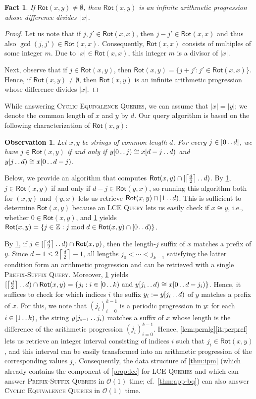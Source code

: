 \documentclass[a4paper]{article}
\newtheorem{fact}[theorem]{Fact}
\newtheorem{observation}[theorem]{Observation}
\theoremstyle{definition}
\theoremstyle{remark}
\newcommand{\BQ}{\textsc{Prefix-Suffix Queries}\xspace}
\newcommand{\FC}{\textsc{Cyclic Equivalence Queries}\xspace}
\newcommand{\LCEQ}{\textsc{LCE Queries}\xspace}
\newcommand{\ceil}[1]{\left\lceil #1 \right\rceil}
\newcommand{\integ}{\mathbb{Z}}
\newcommand{\dd}{\mathinner{\ldotp\ldotp}}
\newcommand{\ROT}{\mathsf{Rot}}
\newcommand{\Oh}{\mathcal{O}}
\begin{document}
\begin{fact}\label{fct:FC}
  If $\ROT(x,y)\ne \emptyset$, then $\ROT(x,y)$ is an infinite arithmetic progression whose difference divides~$|x|$.
\end{fact}
\begin{proof}
  Let us note that if $j,j'\in \ROT(x,x)$, then $j-j'\in \ROT(x,x)$ and thus also $\gcd(j,j')\in \ROT(x,x)$.
  Consequently, $\ROT(x,x)$ consists of multiples of some integer $m$.
  Due to $|x|\in \ROT(x,x)$, this integer $m$ is a divisor of $|x|$.

  Next, observe that if $j\in \ROT(x,y)$, then $\ROT(x,y)=\{j + j' : j'\in \ROT(x,x)\}$.
  Hence, if $\ROT(x,y)\ne \emptyset$, then $\ROT(x,y)$ is an infinite arithmetic progression whose difference divides $|x|$.
\end{proof}

While answering \FC, we can assume that $|x|=|y|$;
we denote the common length of $x$ and $y$ by $d$.
Our query algorithm is based on the following characterization of $\ROT(x,y)$:

\begin{observation}\label{obs:rot}
Let $x,y$ be strings of common length $d$. For every $j\in [0\dd d]$,
we have $j\in \ROT(x,y)$ if and only if $y[0\dd j) \cong x[d-j\dd d)$ and $y[j\dd d)\cong x[0\dd d-j)$.
\end{observation}


Below, we provide an algorithm that computes $\ROT(x,y)\cap [\ceil{\frac{d}{2}}\dd d)$.
By \cref{obs:rot}, $j\in \ROT(x,y)$ if and only if $d-j\in \ROT(y,x)$, so running this algorithm both for $(x,y)$
and $(y,x)$ lets us retrieve $\ROT(x,y)\cap [1\dd d)$.
This is sufficient to determine $\ROT(x,y)$ because an \textsc{LCE Query} lets us easily check if $x \cong y$, i.e., whether $0\in \ROT(x,y)$, and \cref{fct:FC} yields $\ROT(x,y) = \{j \in \integ : j\bmod d \in \ROT(x,y) \cap [0\dd d)\}$.

By \cref{obs:rot}, if $j\in [\ceil{\frac{d}{2}}\dd d)\cap \ROT(x,y)$,
then the length-$j$ suffix of $x$ matches a prefix of $y$.
Since $d-1 \le 2\ceil{\frac{d}{2}}-1$, all lengths $j_0< \cdots < j_{k-1}$ satisfying the latter condition form an arithmetic progression and can be retrieved with a single 
\textsc{Prefix-Suffix Query}. 
Moreover, \cref{obs:rot} yields $[\ceil{\frac{d}{2}}\dd d)\cap \ROT(x,y) = \{j_i : i\in [0\dd k)\text{ and }y[j_i\dd d) \cong x[0\dd d-j_i)\}$.
Hence, it suffices to check for which indices $i$ the suffix $y_i := y[j_i\dd d)$ of $y$ matches a prefix of $x$.
For this, we note that $(j_i)_{i=0}^{k-1}$ is a periodic progression in $y$:
for each $i\in [1\dd k)$, the string $y[j_{i-1}\dd j_{i})$ matches a suffix of $x$
whose length is the difference of the arithmetic progression $(j_i)_{i=0}^{k-1}$.
Hence, \cref{lem:peralg}\ref{it:perpref} lets us retrieve an integer interval
consisting of indices $i$ such that $j_i \in \ROT(x,y)$, and this interval can be easily
transformed into an arithmetic progression of the corresponding values $j_i$.
Consequently, the data structure of \cref{thm:ipm} (which already contains the component of \cref{prop:lce} for \LCEQ and which can answer \BQ in $\Oh(1)$ time; cf.\ \cref{thm:app-bq})
can also answer \FC in $\Oh(1)$ time.
 
\end{document}

